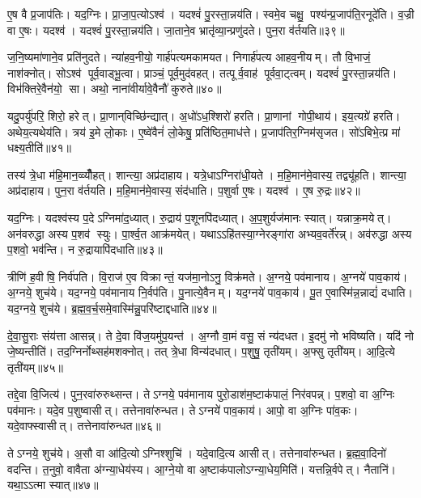 ए॒ष वै प्र॒जाप॑तिः। यद॒ग्निः। प्रा॒जा॒प॒त्योऽश्व॑। यदश्वं॑ पु॒रस्ता॒न्नय॑ति। स्वमे॒व चक्षु॒ पश्य॑न्प्र॒जाप॑ति॒रनूदे॑ति। व॒ज्री वा ए॒षः। यदश्व॑। यदश्वं॑ पु॒रस्ता॒न्नय॑ति। जा॒ताने॒व भ्रातृ॑व्या॒न्प्रणु॑दते। पुन॒रा व॑र्तयति॥३९॥

ज॒नि॒ष्यमा॑णाने॒व प्रति॑नुदते। न्या॑हव॒नीयो॒ गार्\mbox{}ह॑पत्यमकामयत। निगार्\mbox{}ह॑पत्य आहव॒नीयम्। तौ वि॒भाजं॒ नाश॑क्नोत्। सोऽश्व॑ पूर्व॒वाड्भू॒त्वा। प्राञ्चं॒ पूर्व॒मुद॑वहत्। तत्पूर्व॒वाह॑ पूर्ववा॒ट्त्वम्। यदश्वं॑ पु॒रस्ता॒न्नय॑ति। विभ॑क्तिरे॒वैन॑यो॒ सा। अथो॒ नाना॑वीर्यावे॒वैनौ॑ कुरुते॥४०॥

यदु॒पर्यु॑परि॒ शिरो॒ हरेत्। प्रा॒णान्‌विच्छि॑न्द्यात्। अ॒धो॑ऽध॒श्शिरो॑ हरति। प्रा॒णानां गोपी॒थाय॑। इय॒त्यग्रे॑ हरति। अथेय॒त्यथेय॑ति। त्रय॑ इ॒मे लो॒काः। ए॒ष्वे॑वैनं॑ लो॒केषु॒ प्रति॑ष्ठित॒माध॑त्ते। प्र॒जाप॑तिर॒ग्निम॑सृजत। सो॑ऽबिभे॒त्प्र मा॑ धक्ष्य॒तीति॑॥४१॥

तस्य॑ त्रे॒धा म॑हि॒मान॒व्व्यौँ॑हत्। शान्त्या॒ अप्र॑दाहाय। यत्रे॒धाऽग्निरा॑धी॒यते। म॒हि॒मान॑मे॒वास्य॒ तद्व्यू॑हति। शान्त्या॒ अप्र॑दाहाय। पुन॒रा व॑र्तयति। म॒हि॒मान॑मे॒वास्य॒ संद॑धाति। प॒शुर्वा ए॒षः। यदश्व॑। ए॒ष रु॒द्रः॥४२॥

यद॒ग्निः। यदश्व॑स्य प॒देऽग्निमा॑द॒ध्यात्। रु॒द्राय॑ प॒शूनपि॑दध्यात्। अ॒प॒शुर्यज॑मानः स्यात्। यन्नाक्र॒मयेत्। अन॑वरुद्धा अस्य प॒शव॑ स्युः। पा॒र्श्व॒त आक्र॑मयेत्। यथाऽऽहि॑तस्या॒ग्नेरङ्गा॑रा अभ्यव॒वर्ते॑रन्न्। अव॑रुद्धा अस्य प॒शवो॒ भव॑न्ति। न रु॒द्रायापि॑दधाति॥४३॥

त्रीणि॑ ह॒वीषि॒ निर्व॑पति। वि॒राज॑ ए॒व विक्रान्तं॒ यज॑मा॒नोऽनु॒ विक्र॑मते। अ॒ग्नये॒ पव॑मानाय। अ॒ग्नये॑ पाव॒काय॑। अ॒ग्नये॒ शुच॑ये। यद॒ग्नये॒ पव॑मानाय नि॒र्वप॑ति। पु॒नात्ये॒वैनम्। यद॒ग्नये॑ पाव॒काय॑। पू॒त ए॒वास्मि॑न्न॒न्नाद्यं॑ दधाति। यद॒ग्नये॒ शुच॑ये। ब्र॒ह्म॒व॒र्च॒समे॒वास्मि॑न्नु॒परि॑ष्टाद्दधाति॥४४॥\anuvakamend[ए॒न॒मा॒ह॒व॒नीयं॑ धत्तेऽश्व॒त्वं व॑र्तयति कुरुत॒ इति॑ रु॒द्रो द॑धाति॒ य॒दग्नये॒ शुच॑य॒ एकं॑ च]

दे॒वा॒सु॒राः संय॑त्ता आसन्न्। ते दे॒वा वि॑ज॒यमु॑प॒यन्त॑। अ॒ग्नौ वा॒मं वसु॒ सं न्य॑दधत। इ॒दमु॑ नो भविष्यति। यदि॑ नो जे॒ष्यन्तीति॑। तद॒ग्निर्नोथ्सह॑मशक्नोत्। तत् त्रे॒धा विन्य॑दधात्। प॒शुषु॒ तृती॑यम्। अ॒फ्सु तृती॑यम्। आ॒दि॒त्ये तृती॑यम्॥४५॥

तद्दे॒वा वि॒जित्य॑। पुन॒रवा॑रुरुथ्सन्त। तेऽग्नये॒ पव॑मानाय पुरो॒डाश॑म॒ष्टाक॑पालं॒ निर॑वपन्न्। प॒शवो॒ वा अ॒ग्निः पव॑मानः। यदे॒व प॒शुष्वासीत्। तत्तेनावा॑रुन्धत। तेऽग्नये॑ पाव॒काय॑। आपो॒ वा अ॒ग्निः पा॑व॒कः। यदे॒वाफ्स्वासीत्। तत्तेनावा॑रुन्धत॥४६॥

तेऽग्नये॒ शुच॑ये। अ॒सौ वा आ॑दि॒त्योऽग्निश्शुचि॑। यदे॒वादि॒त्य आसीत्। तत्तेनावा॑रुन्धत। ब्र॒ह्म॒वा॒दिनो॑ वदन्ति। त॒नुवो॒ वावैता अ॑ग्न्या॒धेय॑स्य। आ॒ग्ने॒यो वा अ॒ष्टाक॑पालोऽग्न्या॒धेय॒मिति॑। यत्तन्नि॒र्वपेत्। नैतानि॑। यथा॒ऽऽत्मा स्यात्॥४७॥

